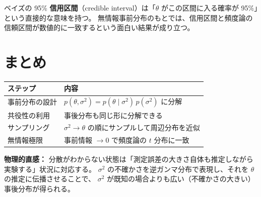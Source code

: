 \documentclass[12pt,a4paper]{ltjsarticle}
\begin{document}
ベイズの 95\% \textbf{信用区間}（credible interval）は「$\theta$ がこの区間に入る確率が 95\%」という直接的な意味を持つ。
無情報事前分布のもとでは、信用区間と頻度論の信頼区間が数値的に一致するという面白い結果が成り立つ。

\section{まとめ}

\begin{center}
\begin{tabular}{ll}
\toprule
ステップ & 内容 \\
\midrule
事前分布の設計 & $p(\theta,\sigma^2) = p(\theta\mid\sigma^2)\,p(\sigma^2)$ に分解 \\
共役性の利用 & 事後分布も同じ形に分解できる \\
サンプリング & $\sigma^2 \to \theta$ の順にサンプルして周辺分布を近似 \\
無情報極限 & 事前情報 $\to 0$ で頻度論の $t$ 分布に一致 \\
\bottomrule
\end{tabular}
\end{center}

\bigskip
\noindent\textbf{物理的直感：}
分散がわからない状態は「測定誤差の大きさ自体も推定しながら実験する」状況に対応する。
$\sigma^2$ の不確かさを逆ガンマ分布で表現し、それを $\theta$ の推定に伝播させることで、
$\sigma^2$ が既知の場合よりも広い（不確かさの大きい）事後分布が得られる。
\end{document}
